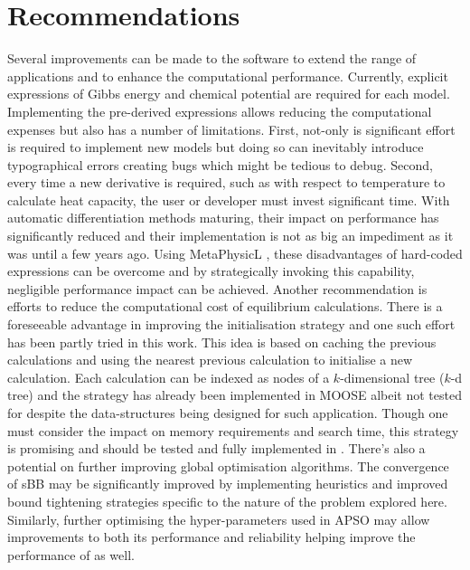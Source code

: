 \chapter{Recommendations} \label{chap:future}
	Several improvements can be made to the software to extend the range of applications and to enhance the computational performance. Currently, explicit expressions of Gibbs energy and chemical potential are required for each model. Implementing the pre-derived expressions allows reducing the computational expenses but also has a number of limitations. First, not-only is significant effort is required to implement new models but doing so can inevitably introduce typographical errors creating bugs which might be tedious to debug. Second, every time a new derivative is required, such as with respect to temperature to calculate heat capacity, the user or developer must invest significant time. With automatic differentiation methods maturing, their impact on performance has significantly reduced and their implementation is not as big an impediment as it was until a few years ago. Using MetaPhysicL \cite{Lindsay:2021aa}, these disadvantages of hard-coded expressions can be overcome and by strategically invoking this capability, negligible performance impact can be achieved. Another recommendation is efforts to reduce the computational cost of equilibrium calculations. There is a foreseeable advantage in improving the initialisation strategy and one such effort has been partly tried in this work. This idea is based on caching the previous calculations and using the nearest previous calculation to initialise a new calculation. Each calculation can be indexed as nodes of a $k$-dimensional tree ($k$-d tree) and the strategy has already been implemented in MOOSE albeit not tested for {\GEM} despite the data-structures being designed for such application. Though one must consider the impact on memory requirements and search time, this strategy is promising and should be tested and fully implemented in \GEM. There's also a potential on further improving global optimisation algorithms. The convergence of sBB may be significantly improved by implementing heuristics and improved bound tightening strategies specific to the nature of the problem explored here. Similarly, further optimising the hyper-parameters used in APSO may allow improvements to both its performance and reliability helping improve the performance of {\GEM} as well.
	

